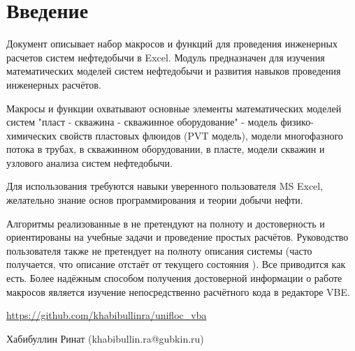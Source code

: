 \chapter*{Введение}                         %

Документ описывает набор макросов и функций \unf{} для проведения инженерных расчетов систем нефтедобычи в Excel. Модуль предназначен для изучения математических моделей систем нефтедобычи и развития навыков проведения инженерных расчётов.

Макросы и функции \unf{} охватывают основные элементы математических моделей систем "пласт - скважина - скважинное оборудование" - модель физико-химических свойств пластовых флюидов (PVT модель), модели многофазного потока в трубах, в скважинном оборудовании, в  пласте, модели скважин и узлового анализа систем нефтедобычи.  

Для использования \unf{} требуются навыки уверенного пользователя MS Excel, желательно знание основ программирования и теории добычи нефти. 

Алгоритмы реализованные в  \unf{} не претендуют на полноту и достоверность и ориентированы на учебные задачи и проведение простых расчётов. Руководство пользователя также не претендует на полноту описания системы (часто получается, что описание отстаёт от текущего состояния \unf{}). Все приводится как есть. Более надёжным способом получения достоверной информации о работе макросов \unf{} является изучение непосредственно расчётного кода в редакторе VBE.


\url{https://github.com/khabibullinra/unifloc_vba}

Хабибуллин Ринат (khabibullin.ra@gubkin.ru)  